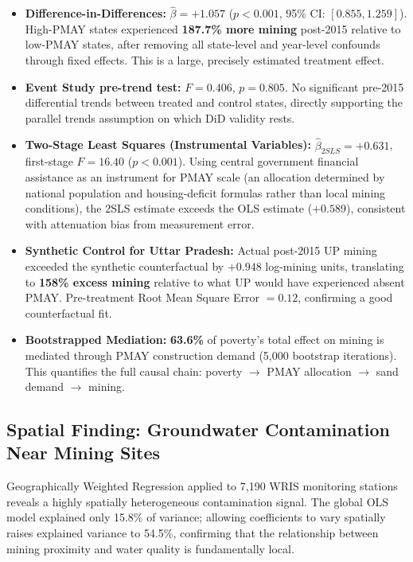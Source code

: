 \documentclass[12pt]{article}
\begin{document}
\begin{itemize}
    \item \textbf{Difference-in-Differences:} $\hat{\beta} = +1.057$ ($p < 0.001$, 95\% CI: $[0.855, 1.259]$). High-PMAY states experienced \textbf{187.7\% more mining} post-2015 relative to low-PMAY states, after removing all state-level and year-level confounds through fixed effects. This is a large, precisely estimated treatment effect.
    \item \textbf{Event Study pre-trend test:} $F = 0.406$, $p = 0.805$. No significant pre-2015 differential trends between treated and control states, directly supporting the parallel trends assumption on which DiD validity rests.
    \item \textbf{Two-Stage Least Squares (Instrumental Variables):} $\hat{\beta}_{2SLS} = +0.631$, first-stage $F = 16.40$ ($p < 0.001$). Using central government financial assistance as an instrument for PMAY scale (an allocation determined by national population and housing-deficit formulas rather than local mining conditions), the 2SLS estimate exceeds the OLS estimate ($+0.589$), consistent with attenuation bias from measurement error.
    \item \textbf{Synthetic Control for Uttar Pradesh:} Actual post-2015 UP mining exceeded the synthetic counterfactual by $+0.948$ log-mining units, translating to \textbf{158\% excess mining} relative to what UP would have experienced absent PMAY. Pre-treatment Root Mean Square Error $= 0.12$, confirming a good counterfactual fit.
    \item \textbf{Bootstrapped Mediation:} \textbf{63.6\%} of poverty's total effect on mining is mediated through PMAY construction demand (5,000 bootstrap iterations). This quantifies the full causal chain: poverty $\rightarrow$ PMAY allocation $\rightarrow$ sand demand $\rightarrow$ mining.
\end{itemize}

\subsection{Spatial Finding: Groundwater Contamination Near Mining Sites}

Geographically Weighted Regression applied to 7,190 WRIS monitoring stations reveals a highly spatially heterogeneous contamination signal. The global OLS model explained only 15.8\% of variance; allowing coefficients to vary spatially raises explained variance to 54.5\%, confirming that the relationship between mining proximity and water quality is fundamentally local.
\end{document}
